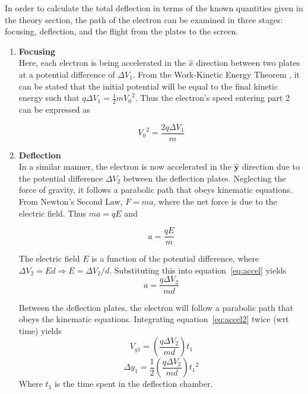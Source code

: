\documentclass[twocolumn,english]{IEEEtran}
\theoremstyle{plain}
\theoremstyle{plain}
\begin{document}
In order to calculate the total deflection in terms of the known quantities given in the theory section, the path of the electron can be examined in three stages: focusing, deflection, and the flight from the plates to the screen.
\begin{enumerate}
 \item \textbf{Focusing} \\
 Here, each electron is being accelerated in the $\hat{x}$ direction between two plates at a potential difference of $\Delta V_1$. From the Work-Kinetic Energy Theorem \cite{serway2013physics}, it can be stated that the initial potential will be equal to the final kinetic energy such that $q \Delta V_1 = \frac{1}{2}m{V_0}^2$. Thus the electron's speed entering part 2 can be expressed as

 \begin{equation} \label{eq:v0}
 {V_0}^2 = \frac{2q\Delta V_1}{m}
 \end{equation}

 \item \textbf{Deflection} \\
 In a similar manner, the electron is now accelerated in the $\mathbf{\hat{y}}$ direction due to the potential difference $\Delta V_2$ between the deflection plates. Neglecting the force of gravity, it follows a parabolic path that obeys kinematic equations. From Newton's Second Law, $F=ma$, where the net force is due to the electric field. Thus $ma = qE$ and

 \begin{equation}\label{eq:accel}
 a = \frac{qE}{m}
 \end{equation}

 The electric field $E$ is a function of the potential difference, where $\Delta V_2 = Ed \Rightarrow E = \Delta V_2/d.$ Substituting this into equation~\eqref{eq:accel} yields
 \begin{equation}\label{eq:accel2}
 a = \frac{q\Delta V_2}{md}
 \end{equation}

 Between the deflection plates, the electron will follow a parabolic path that obeys the kinematic equations. Integrating equation~\eqref{eq:accel2} twice (wrt time) yields
 \begin{equation}\label{eq:vy1}
  V_{y1} = (\frac{q\Delta V_2}{md})t_1
 \end{equation}
 \begin{equation}\label{eq:y1}
  \Delta y_1 = \frac{1}{2}(\frac{q\Delta V_2}{md}){t_1}^2
 \end{equation}
 Where $t_1$ is the time spent in the deflection chamber.



\end{enumerate}
\end{document}
